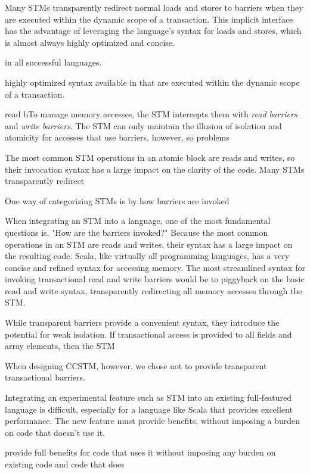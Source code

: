Many STMs transparently redirect normal loads
and stores to barriers when they are executed within the dynamic scope of
a transaction.  This implicit interface has the advantage of leveraging
the language's syntax for loads and stores, which is almost always highly
optimized and concise.


in all successful
languages.

highly optimized syntax
available in 
that are executed within the dynamic scope of a transaction.

read bTo manage memory accesses, the STM intercepts
them with \textit{read barriers} and \textit{write barriers}.  The STM can only
maintain the illusion of isolation and atomicity for accesses that use
barriers, however, so problems 


The
most common STM operations in an atomic block are reads and writes, so their
invocation syntax has a large impact on the clarity of the code.  Many STMs
transparently redirect 


One way of
categorizing STMs is by how barriers are invoked

When integrating an STM into a language, one of the most fundamental
questions is, "How are the barriers invoked?" Because the most common
operations in an STM are reads and writes, their syntax has a large impact
on the resulting code.  Scala, like virtually all programming languages,
has a very concise and refined syntax for accessing memory.  The most
streamlined syntax for invoking transactional read and write barriers
would be to piggyback on the basic read and write syntax, transparently
redirecting all memory accesses through the STM.

While transparent barriers provide a convenient syntax, they introduce the
potential for weak isolation.  If transactional access is provided to all
fields and array elements, then the STM 

When designing CCSTM,
however, we chose not to provide transparent transactional barriers.



Integrating an experimental feature such as STM into an existing full-featured
language is difficult, especially for a language like Scala that provides
excellent performance.  The new feature must provide benefits, without 
imposing a burden on code that doesn't use it.

provide full benefits for code
that uses it without imposing any burden on existing code and code that does

